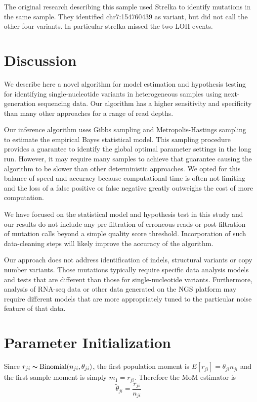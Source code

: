 \documentclass[11pt,reqno]{amsart}
\begin{document}
The original research describing this sample used Strelka to identify mutations in the same sample. They identified chr7:154760439 as variant, but did not call the other four variants. In particular strelka missed the two LOH events.

\section{Discussion}

We describe here a novel algorithm for model estimation and hypothesis testing for identifying single-nucleotide variants in heterogeneous samples using next-generation sequencing data. Our algorithm has a higher sensitivity and specificity than many other approaches for a range of read depths.

Our inference algorithm uses Gibbs sampling and Metropolis-Hastings sampling to estimate the empirical Bayes statistical model. This sampling procedure provides a guarantee to identify the global optimal parameter settings in the long run. However, it may require many samples to achieve that guarantee causing the algorithm to be slower than other deterministic approaches. We opted for this balance of speed and accuracy because computational time is often not limiting and the loss of a false positive or false negative greatly outweighs the cost of more computation.

We have focused on the statistical model and hypothesis test in this study and our results do not include any pre-filtration of erroneous reads or post-filtration of mutation calls beyond a simple quality score threshold. Incorporation of such data-cleaning steps will likely improve the accuracy of the algorithm.

Our approach does not address identification of indels, structural variants or copy number variants. Those mutations typically require specific data analysis models and tests that are different than those for single-nucleotide variants. Furthermore, analysis of RNA-seq data or other data generated on the NGS platform may require different models that are more appropriately tuned to the particular noise feature of that data.

\appendix

\section{Parameter Initialization}\label{sec:appendix_mom}
Since $r_{ji} \thicksim \text{Binomial}(n_{ji}, \theta_{ji})$, the first population moment is  $E[r_{ji}] = \theta_{ji} n_{ji}$ and the first sample moment is simply $m_1 = r_{ji}$. Therefore the MoM estimator is 
\begin{equation}
	\tilde{\theta}_{ji} = \frac{r_{ji}} {n_{ji}}
\end{equation}
\end{document}
